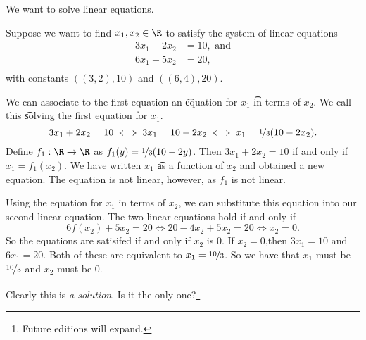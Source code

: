 

We want to solve linear equations.


Suppose we want to find $x_1, x_2 \in \R$ to satisfy the system of linear equations
\[
\begin{aligned}
  3x_1 + 2x_2 &= 10, \text{ and} \\
  6x_1 + 5x_2 &= 20, \\
\end{aligned}
\]
with constants $((3, 2), 10)$ and $((6, 4), 20)$.

We can associate to the first equation an \t{equation for} $x_1$ \t{in terms of} $x_2$.
We call this \t{solving the first equation for $x_1$}.
\[
  3x_1 + 2x_2 = 10 \iff 3x_1 = 10 - 2x_2 \iff x_1 = \nicefrac{1}{3}(10 - 2x_2).
\]
Define $f_1: \R \to \R$ as $f_1(y) = \nicefrac{1}{3}(10 - 2y)$.
Then $3x_1 + 2x_2 = 10$ if and only if $x_1 = f_1(x_2)$.
We have written $x_1$ \t{as a function} of $x_2$ and obtained a new equation.
The equation is not linear, however, as $f_1$ is not linear.

Using the equation for $x_1$ in terms of $x_2$, we can substitute this equation into our second linear equation.
The two linear equations hold if and only if
\[
  6f(x_2) + 5x_2 = 20 \iff 20 - 4x_2 + 5x_2 = 20 \iff x_2 = 0.
\]
So the equations are satisifed if and only if $x_2$ is $0$.
If $x_2 = 0$,then $3x_1 = 10$ and $6x_1 = 20$.
Both of these are equivalent to $x_1 = \nicefrac{10}{3}$.
So we have that $x_1$ must be $\nicefrac{10}{3}$ and $x_2$ must be 0.

Clearly this is \textit{a solution}.
Is it the only one?\footnote{Future editions will expand.}

\blankpage
